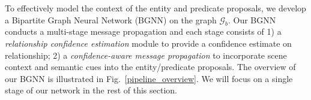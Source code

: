 %
%
%

To effectively model the context of the entity and predicate proposals, we develop a Bipartite Graph Neural Network (BGNN) on the graph $\mathcal{G}_b$.   
Our BGNN conducts a multi-stage message propagation and each stage consists of 1) a \textit{relationship confidence estimation} module to provide a confidence estimate on relationship; 2) a \textit{confidence-aware message propagation} to incorporate scene context and semantic cues into the entity/predicate proposals.
The overview of our BGNN is illustrated in Fig.~\ref{pipeline_overview}. We will focus on a single stage of our network in the rest of this section.
 
